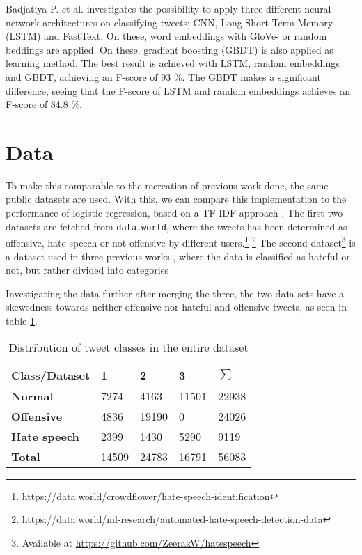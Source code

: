 \documentclass[twocolumn]{article}
\begin{document}
Badjatiya P. et al. \cite{DLNN} investigates the possibility to apply three different neural network architectures on classifying tweets; CNN, Long Short-Term Memory (LSTM) and FastText. On these, word embeddings with GloVe- or random beddings are applied. \cite{DLNN} On these, gradient boosting (GBDT) is also applied as learning method. The best result is achieved with LSTM, random embeddings and GBDT, achieving an F-score of 93 \%. The GBDT makes a significant difference, seeing that the F-score of LSTM and random embeddings achieves an F-score of 84.8 \%. 

\section{Data}

To make this comparable to the recreation of previous work done, the same public datasets are used. With this, we can compare this implementation to the performance of logistic regression, based on a TF-IDF approach \cite{gaydhani}. The first two datasets are fetched from \verb|data.world|, where the tweets has been determined as offensive, hate speech or not offensive by different users.\footnote{\label{dataset1}\url{https://data.world/crowdflower/hate-speech-identification}} \footnote{\label{dataset2}\url{https://data.world/ml-research/automated-hate-speech-detection-data}} The second dataset\footnote{\label{dataset3} Available at \url{https://github.com/ZeerakW/hatespeech}} is a dataset used in three previous works \cite{gaydhani, Gambck2017,Waseem2016HatefulSO}, where the data is classified as hateful or not, but rather divided into categories 

Investigating the data further after merging the three, the two data sets have a skewedness towards neither offensive nor hateful and offensive tweets, as seen in table \ref{tab:labeldist}. 


\begin{table}[h]
\caption{Distribution of tweet classes in the entire dataset}
\label{tab:labeldist}
\begin{tabular}{|l|l|l|l|l|}
\hline
\textbf{Class/Dataset} & \textbf{1} & \textbf{2} & \textbf{3} & \textbf{$\sum$} \\ \hline
\textbf{Normal}        & 7274       & 4163       & 11501       & 22938           \\ \hline
\textbf{Offensive}     & 4836       & 19190      & 0          & 24026           \\ \hline
\textbf{Hate speech}   & 2399       & 1430       & 5290       & 9119            \\ \hline
\textbf{Total}         & 14509      & 24783      & 16791      & 56083           \\ \hline
\end{tabular}
\end{table}
\end{document}
